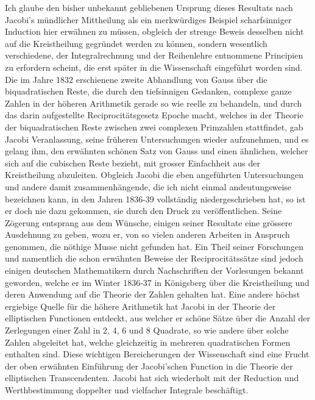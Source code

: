 \documentclass[11pt]{article}
\begin{document}
Ich glaube den bisher unbekannt gebliebenen Ursprung dieses Resultats nach Jacobi’s mündlicher Mittheilung als ein merkwürdiges Beispiel scharfsinniger Induction hier erwähnen zu müssen, obgleich der strenge Beweis desselben nicht auf die Kreistheilung gegründet werden zu können, sondern wesentlich verschiedene, der Integralrechnung und der Reihenlehre entnommene Principien zu erfordern scheint, die erst später in die Wissenschaft eingeführt worden sind. Die im Jahre 1832 erschienene zweite Abhandlung von Gauss über die biquadratischen Reste, die durch den tiefsinnigen Gedanken, complexe ganze Zahlen in der höheren Arithmetik gerade so wie reelle zu behandeln, und durch das darin aufgestellte Reciprocitätsgesetz Epoche macht, welches in der Theorie der biquadratischen Reste zwischen zwei complexen Primzahlen stattfindet, gab Jacobi Veranlassung, seine früheren Untersuchungen wieder aufzunehmen, und es gelang ihm, den erwähnten schönen Satz von Gauss und einen ähnlichen, welcher sich auf die cubischen Reste bezieht, mit grosser Einfachheit aus der Kreistheilung abzuleiten. Obgleich Jacobi die eben angeführten Untersuchungen und andere damit zusammenhängende, die ich nicht einmal andeutungsweise bezeichnen kann, in den Jahren 1836-39 vollständig niedergeschrieben hat, so ist er doch nie dazu gekommen, sie durch den Druck zu veröffentlichen. Seine Zögerung entsprang aus dem Wünsche, einigen seiner Resultate eine grössere Ausdehnung zu geben, wozu er, von so vielen anderen Arbeiten in Anspruch genommen, die nöthige Musse nicht gefunden hat. Ein Theil seiner Forschungen und namentlich die schon erwähnten Beweise der Reciprocitätssätze sind jedoch einigen deutschen Mathematikern durch Nachschriften der Vorlesungen bekannt geworden, welche er im Winter 1836-37 in Königsberg über die Kreistheilung und deren Anwendung auf die Theorie der Zahlen gehalten hat. Eine andere höchst ergiebige Quelle für die höhere Arithmetik hat Jacobi in der Theorie der elliptischen Functionen entdeckt, aus welcher er schöne Sätze über die Anzahl der Zerlegungen einer Zahl in 2, 4, 6 und 8 Quadrate, so wie andere über solche Zahlen abgeleitet hat, welche gleichzeitig in mehreren quadratischen Formen enthalten sind. Diese wichtigen Bereicherungen der Wissenschaft sind eine Frucht der oben erwähnten Einführung der Jacobi’schen Function in die Theorie der elliptischen Transcendenten. Jacobi hat sich wiederholt mit der Reduction und Werthbestimmung doppelter und vielfacher Integrale beschäftigt.
\end{document}
